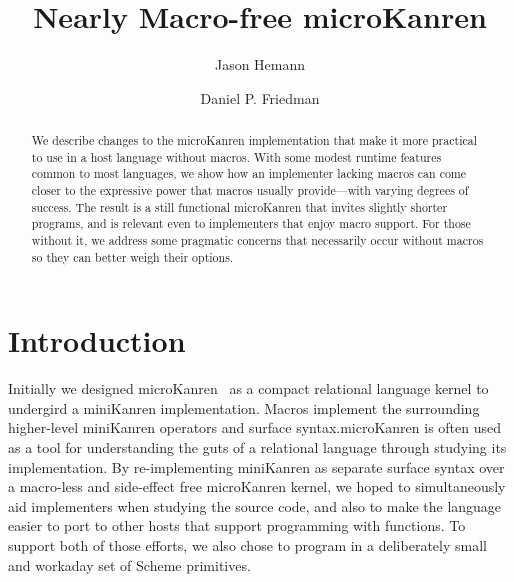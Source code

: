 \documentclass[runningheads,natbib=false]{llncs}
\begin{document}
\author{Jason Hemann \and
Daniel P. Friedman}

\title{Nearly Macro-free microKanren}

%
%
%

\maketitle

\begin{abstract}

  We describe changes to the microKanren implementation that make it
  more practical to use in a host language without macros. With
  some modest runtime features common to most languages, we
  show how an implementer lacking macros can come closer to the
  expressive power that macros usually provide---with varying degrees
  of success. The result is a still functional microKanren that
  invites slightly shorter programs, and is relevant even to
  implementers that enjoy macro support. For those without it, we
  address some pragmatic concerns that necessarily occur without
  macros so they can better weigh their options.

\end{abstract}


\section{Introduction}

Initially we designed microKanren~\cite{hemann2013muKanren} as a
compact relational language kernel to undergird a miniKanren
implementation. Macros implement the surrounding higher-level
miniKanren operators and surface syntax.\@ microKanren is often used
as a tool for understanding the guts of a relational language through
studying its implementation. By re-implementing miniKanren as separate
surface syntax over a macro-less and side-effect free
microKanren kernel, we hoped to simultaneously aid implementers when
studying the source code, and also to make the language easier to port
to other hosts that support programming with functions. To support
both of those efforts, we also chose to program in a deliberately
small and workaday set of Scheme primitives.
\end{document}
